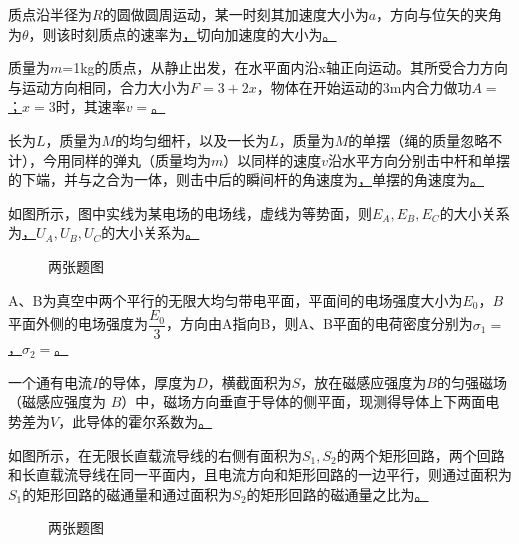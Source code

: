 质点沿半径为$R$的圆做圆周运动，某一时刻其加速度大小为$a$，方向与位矢的夹角为$\theta$，则该时刻质点的速率为\ul，切向加速度的大小为\ul。

质量为$m$=1kg的质点，从静止出发，在水平面内沿x轴正向运动。其所受合力方向与运动方向相同，合力大小为$F=3+2x$，物体在开始运动的3m内合力做功$A=$\ul；$x=3$时，其速率$v=$\ul。

长为$L$，质量为$M$的均匀细杆，以及一长为$L$，质量为$M$的单摆（绳的质量忽略不计），今用同样的弹丸（质量均为$m$）以同样的速度$v$沿水平方向分别击中杆和单摆的下端，并与之合为一体，则击中后的瞬间杆的角速度为\ul，单摆的角速度为\ul。

如图所示，图中实线为某电场的电场线，虚线为等势面，则$E_A,E_B,E_C$的大小关系为\ul，$U_A,U_B,U_C$的大小关系为\ul。


\begin{figure}[!h]
	\centering
	\quad
	\caption{两张题图}
\end{figure}

A、B为真空中两个平行的无限大均匀带电平面，平面间的电场强度大小为$E_0$，$B$平面外侧的电场强度为$\dfrac{E_0}{3}$，方向由A指向B，则A、B平面的电荷密度分别为$\sigma_1=$\ul，$\sigma_2=$\ul。

一个通有电流$I$的导体，厚度为$D$，横截面积为$S$，放在磁感应强度为$B$的匀强磁场（磁感应强度为 $B$）中，磁场方向垂直于导体的侧平面，现测得导体上下两面电势差为$V$，此导体的霍尔系数为\ul。

如图所示，在无限长直载流导线的右侧有面积为$S_1,S_2$的两个矩形回路，两个回路和长直载流导线在同一平面内，且电流方向和矩形回路的一边平行，则通过面积为$S_1$的矩形回路的磁通量和通过面积为$S_2$的矩形回路的磁通量之比为\ul。

\begin{figure}[!h]
	\centering
	\quad
	\caption{两张题图}
\end{figure}

